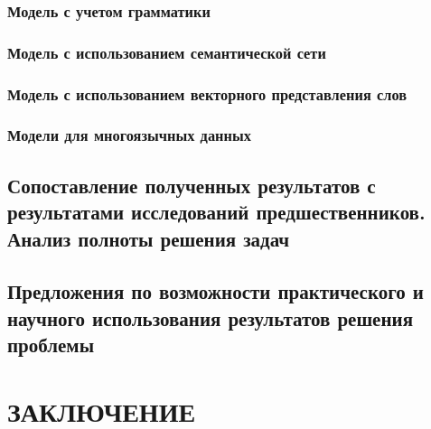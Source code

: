 \documentclass[a4paper,14pt,oneside,openany]{memoir}
\begin{document}
\subsection{Модель с учетом грамматики}

\subsection{Модель с использованием семантической сети}

\subsection{Модель с использованием векторного представления слов}

\subsection{Модели для многоязычных данных}

\section{Сопоставление полученных результатов с результатами исследований предшественников.
Анализ полноты решения задач}

\section{Предложения по возможности практического и научного использования результатов решения проблемы}

\chapter*{ЗАКЛЮЧЕНИЕ}

\printbibliography[title={СПИСОК ИСПОЛЬЗОВАННОЙ ЛИТЕРАТУРЫ},category=cited]
\printbibliography[title={Непроцитированные источники (должно быть пусто)},notcategory=cited]
\end{document}
